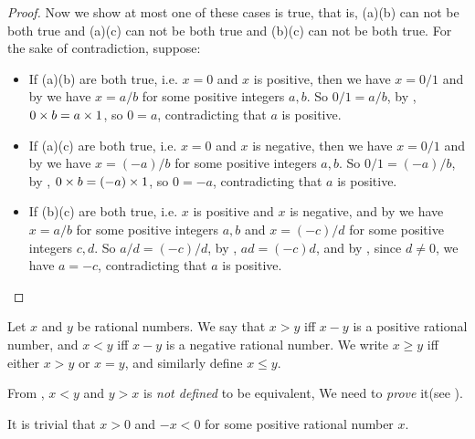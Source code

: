 \begin{proof}
Now we show at most one of these cases is true, that is, (a)(b) can not be both true and (a)(c) can not be both true and (b)(c) can not be both true.
For the sake of contradiction, suppose:
\begin{itemize}
    \item
        If (a)(b) are both true, i.e. \(x = 0\) and \(x\) is positive, then we have \(x = 0/1\) and by  we have \(x = a / b\) for some positive integers \(a, b\).
        So \(0/1 = a/b\), by , \(0 \times b = a \times 1\), so \(0 = a\), contradicting that \(a\) is positive.
    \item
        If (a)(c) are both true, i.e. \(x = 0\) and \(x\) is negative, then we have \(x = 0/1\) and by  we have \(x = (-a) / b\) for some positive integers \(a, b\).
        So \(0/1 = (-a)/b\), by , \(0 \times b = (-a) \times 1\), so \(0 = -a\), contradicting that \(a\) is positive.
    \item
        If (b)(c) are both true, i.e. \(x\) is positive and \(x\) is negative, and by  we have \(x = a/b\) for some positive integers \(a, b\) and \(x = (-c)/d\) for some positive integers \(c, d\).
        So \(a/d = (-c)/d\), by , \(ad = (-c)d\), and by , since \(d \neq 0\), we have \(a = -c\), contradicting that \(a\) is positive.
\end{itemize}
\end{proof}

\begin{definition}  \label{def 4.2.8}
Let \(x\) and \(y\) be rational numbers.
We say that \(x > y\) iff \(x - y\) is a positive rational number,
and \(x < y\) iff \(x - y\) is a negative rational number.
We write \(x \ge y\) iff either \(x > y\) or \(x = y\), and similarly define \(x \le y\).
\end{definition}

\begin{note}
From , \(x < y\) and \(y > x\) is \emph{not defined} to be equivalent, We need to \emph{prove} it(see ).
\end{note}
\begin{note}
It is trivial that \(x > 0\) and \(-x < 0\) for some positive rational number \(x\).
\end{note}


